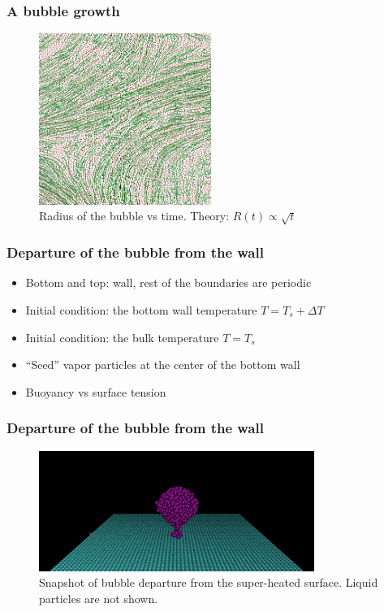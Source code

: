 \documentclass{beamer}
\begin{document}
\begin{frame}
  \frametitle{A bubble growth}
  \begin{figure}[ht]
    \centering
    \includegraphics[width=0.5\textwidth]{img/polymer_loc.png}
    \caption{Radius of the bubble vs time. Theory: $R(t) \propto \sqrt{t}$}
    \label{fig:dep}
  \end{figure}
\end{frame}

\begin{frame}
  \frametitle{Departure of the bubble from the wall}
  \begin{itemize}
  \item Bottom and top: wall, rest of the boundaries are periodic
  \item Initial condition: the bottom wall temperature $T=T_s + \Delta T$
  \item Initial condition: the bulk temperature $T=T_s$
  \item ``Seed'' vapor particles at the center of the bottom wall
  \item Buoyancy vs surface tension
  \end{itemize}
\end{frame}

\begin{frame}
  \frametitle{Departure of the bubble from the wall}
  \begin{figure}[ht]
    \centering
    \includegraphics[width=0.8\textwidth]{gnuplot/dep-59.pdf}
    \caption{Snapshot of bubble departure from the super-heated
      surface. Liquid particles are not shown.}
    \label{fig:snapshot}
  \end{figure}
\end{frame}
\end{document}
